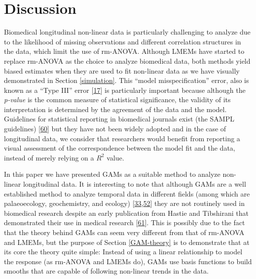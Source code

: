 \documentclass[
]{article}
\begin{document}
\FloatBarrier

\hypertarget{discussion}{%
\section{Discussion}\label{discussion}}

Biomedical longitudinal non-linear data is particularly challenging to analyze due to the likelihood of missing observations and different correlation structures in the data, which limit the use of rm-ANOVA. Although LMEMs have started to replace rm-ANOVA as the choice to analyze biomedical data, both methods yield biased estimates when they are used to fit non-linear data as we have visually demonstrated in Section \ref{simulation}. This ``model misspecification'' error, also is known as a ``Type III'' error {[}\protect\hyperlink{ref-dennis2019}{17}{]} is particularly important because although the \emph{p-value} is the common measure of statistical significance, the validity of its interpretation is determined by the agreement of the data and the model. Guidelines for statistical reporting in biomedical journals exist (the SAMPL guidelines) {[}\protect\hyperlink{ref-lang2015}{60}{]} but they have not been widely adopted and in the case of longitudinal data, we consider that researchers would benefit from reporting a visual assessment of the correspondence between the model fit and the data, instead of merely relying on a \(R^2\) value.

In this paper we have presented GAMs as a suitable method to analyze non-linear longitudinal data. It is interesting to note that although GAMs are a well established method to analyze temporal data in different fields (among which are palaeoecology, geochemistry, and ecology) {[}\protect\hyperlink{ref-pedersen2019}{33},\protect\hyperlink{ref-hefley2017}{52}{]} they are not routinely used in biomedical research despite an early publication from Hastie and Tibshirani that demonstrated their use in medical research {[}\protect\hyperlink{ref-hastie1995}{61}{]}. This is possibly due to the fact that the theory behind GAMs can seem very different from that of rm-ANOVA and LMEMs, but the purpose of Section \ref{GAM-theory} is to demonstrate that at its core the theory quite simple: Instead of using a linear relationship to model the response (as rm-ANOVA and LMEMs do), GAMs use basis functions to build smooths that are capable of following non-linear trends in the data.
\end{document}
